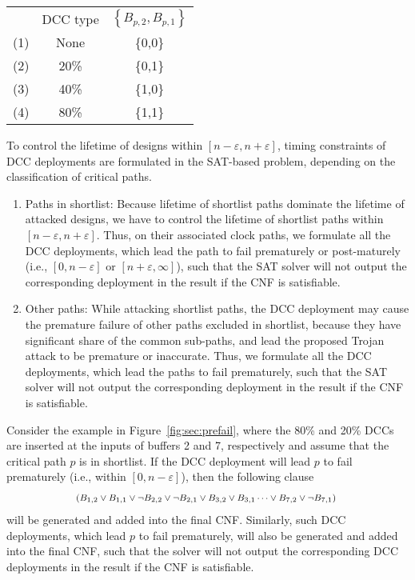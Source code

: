 {\small
\begin{tabular}{ c c c }
   & DCC type & $\left\{B_{p,2},B_{p,1}\right\}$ \\
  (1)\quad & None & \{0,0\} \\
  (2)\quad & 20\% &  \{0,1\} \\
  (3)\quad & 40\% &  \{1,0\} \\
  (4)\quad & 80\% &  \{1,1\} \\
\end{tabular}}

To control the lifetime of designs within $[n - \varepsilon, n + \varepsilon]$, timing constraints of DCC deployments are formulated in the SAT-based problem, depending on the classification of critical paths.
\begin{enumerate}[leftmargin=*]%
	\item Paths in shortlist: Because lifetime of shortlist paths dominate the lifetime of attacked designs, we have to control the lifetime of shortlist paths within $[n - \varepsilon, n + \varepsilon]$. Thus, on their associated clock paths, we formulate all the DCC deployments, which lead the path to fail prematurely or post-maturely (i.e., $[ 0, n - \varepsilon]$ or $[ n + \varepsilon, \infty]$), such that the SAT solver will not output the corresponding deployment in the result if the CNF is satisfiable.
	\item Other paths: While attacking shortlist paths, the DCC deployment may cause the premature failure of other paths excluded in shortlist, because they have significant share of the common sub-paths, and lead the proposed Trojan attack to be premature or inaccurate. %
	Thus, we formulate all the DCC deployments, which lead the paths to fail prematurely, such that the SAT solver will not output the corresponding deployment in the result if the CNF is satisfiable. 
\end{enumerate}

Consider the example in Figure~\ref{fig:sec:prefail}, where the 80\% and 20\% DCCs are inserted at the inputs of buffers 2 and 7, respectively and assume that the critical path $p$ is in shortlist. If the DCC deployment will lead $p$ to fail prematurely (i.e., within $[ 0, n - \varepsilon]$), then the following clause
\begin{gather*}
	\fontsize{8}{8} \selectfont
	\mbox{($B_{1,2} \lor B_{1,1} \lor \neg B_{2,2} \lor \neg B_{2,1}  \lor B_{3,2} \lor B_{3,1} \dots \lor B_{7,2} \lor \neg B_{7,1}$) } 
\end{gather*}
will be generated and added into the final CNF. Similarly, such DCC deployments, which lead $p$ to fail prematurely, will also be generated and added into the final CNF, such that the solver will not output the corresponding DCC deployments in the result if the CNF is satisfiable. 

